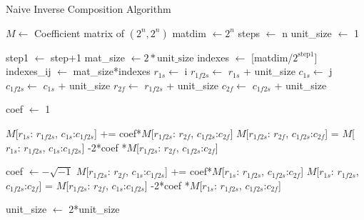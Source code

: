 \documentclass[twocolumn]{article}
\begin{document}
\begin{algorithm}
    \caption{Naive Inverse Composition Algorithm}\label{alg:naive_inverse}
    \begin{algorithmic}
        \Require $M \gets$ Coefficient matrix of $(2^n, 2^n)$
        \State matdim $\gets 2^n$
        \State steps $\gets$ n
        \State unit\_size $\gets$ 1

            \State step1 $\gets$ step+1
            \State mat\_size $\gets 2*\text{unit\_size}$
            \State indexes $\gets$ [matdim/$2^{\text{step1}}$]
            \State indexes\_ij $\gets$ mat\_size*indexes
                \State $r_{1s}\gets$ i
                \State $r_{1f2s}\gets$ $r_{1s}$ + unit\_size
                \State $c_{1s}\gets$ j
                \State $c_{1f2s}\gets$ $c_{1s}$ + unit\_size
                \State $r_{2f}\gets$ $r_{1f2s}$ + unit\_size
                \State $c_{2f}\gets$ $c_{1f2s}$ + unit\_size

                \State coef $\gets$ 1

                \State $M$[$r_{1s}$: $r_{1f2s}$, $c_{1s}$:$c_{1f2s}$] += coef*$M$[$r_{1f2s}$: $r_{2f}$, $c_{1f2s}$:$c_{2f}$]
                \State $M$[$r_{1f2s}$: $r_{2f}$, $c_{1f2s}$:$c_{2f}$] = $M$[$r_{1s}$: $r_{1f2s}$, $c_{1s}$:$c_{1f2s}$] -2*coef *$M$[$r_{1f2s}$: $r_{2f}$, $c_{1f2s}$:$c_{2f}$]

                \State coef $\gets - \sqrt{-1}$ 
                \State $M$[$r_{1f2s}$: $r_{2f}$, $c_{1s}$:$c_{1f2s}$] += coef*$M$[$r_{1s}$: $r_{1f2s}$, $c_{1f2s}$:$c_{2f}$]
                \State $M$[$r_{1s}$: $r_{1f2s}$, $c_{1f2s}$:$c_{2f}$] = $M$[$r_{1f2s}$: $r_{2f}$, $c_{1s}$:$c_{1f2s}$] -2*coef *$M$[$r_{1s}$: $r_{1f2s}$, $c_{1f2s}$:$c_{2f}$]
                
                \EndFor
            \EndFor
            \State unit\_size $\gets$ 2*unit\_size
        \EndFor
    \end{algorithmic}
\end{algorithm}
\end{document}
